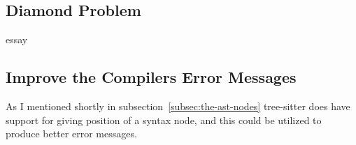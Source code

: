\subsection{Diamond Problem}\label{subsec:diamond-problem}

essay

\subsection{Improve the Compilers Error Messages}\label{subsec:compiler-with-focus-on-error-messages}

As I mentioned shortly in subsection~\vref{subsec:the-ast-nodes} tree-sitter does have support for giving position of a syntax node, and this could be utilized to produce better error messages.

